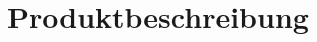 \documentclass[main.tex]{subfiles} %
\begin{document}
\section{Produktbeschreibung}


\newpage


\newpage
\end{document}
